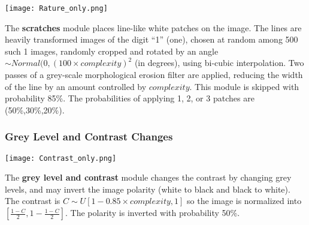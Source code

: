 \documentclass{article} %
\begin{document}
\begin{minipage}[t]{0.14\textwidth}
\begin{center}
\vspace*{4mm}
\texttt{[image: Rature\_only.png]}\\
\end{center}
\end{minipage}%
\hspace{0.3cm}\begin{minipage}[t]{0.86\linewidth}
The {\bf scratches} module places line-like white patches on the image.  The
lines are heavily transformed images of the digit ``1'' (one), chosen
at random among 500 such 1 images,
randomly cropped and rotated by an angle $\sim Normal(0,(100 \times
complexity)^2$ (in degrees), using bi-cubic interpolation.
Two passes of a grey-scale morphological erosion filter
are applied, reducing the width of the line
by an amount controlled by $complexity$.
This module is skipped with probability 85\%. The probabilities
of applying 1, 2, or 3 patches are (50\%,30\%,20\%).
\end{minipage}


\subsubsection*{Grey Level and Contrast Changes}

\begin{minipage}[t]{0.15\linewidth}
\centering
\vspace*{0mm}
\texttt{[image: Contrast\_only.png]}
\end{minipage}%
\hspace{3mm}\begin{minipage}[t]{0.85\linewidth}
\vspace*{1mm}
The {\bf grey level and contrast} module changes the contrast by changing grey levels, and may invert the image polarity (white
to black and black to white). The contrast is $C \sim U[1-0.85 \times complexity,1]$ 
so the image is normalized into $[\frac{1-C}{2},1-\frac{1-C}{2}]$. The
polarity is inverted with probability 50\%.
\end{minipage}
\end{document}
